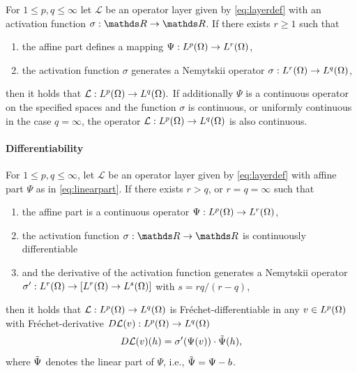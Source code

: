\begin{proposition}{\cite[Prop. 1]{kabri2023resolution}}{}
	For $1 \leq p, q \leq \infty$ let $\mathcal{L}$ be an operator layer given by \eqref{eq:layerdef} with an activation function $\sigma: \R \rightarrow \R$.
	If there exists $r \geq 1$ such that
	\begin{enumerate}[label=(\roman*)]
		\item the affine part defines a mapping $\Psi: L^p(\Omega) \rightarrow L^r(\Omega)$,
		\item the activation function $\sigma$ generates a Nemytskii operator $\sigma: L^r(\Omega) \rightarrow L^q(\Omega)$,
	\end{enumerate}
	then it holds that
	$
	\mathcal{L}: L^p(\Omega) \rightarrow L^q(\Omega).
	$
	If additionally $\Psi$ is a continuous operator on the specified spaces and the function $\sigma$ is continuous, or uniformly continuous in the case $q=\infty$, the operator $\mathcal{L}: L^p(\Omega) \rightarrow L^q(\Omega)$ is also continuous.
\end{proposition}

\paragraph{Differentiability}

\begin{proposition}{\cite[Prop. 2]{kabri2023resolution}}{}
	For $1 \leq p, q \leq \infty$, let $\mathcal{L}$ be an operator layer given by \eqref{eq:layerdef} with affine part $\Psi$ as in \eqref{eq:linearpart}. If there exists $r>q$, or $r = q = \infty$ such that
	\begin{enumerate}[label=(\roman*)]
		\item the affine part is a continuous operator $\Psi: L^p(\Omega) \rightarrow L^r(\Omega)$,
		\item the activation function $\sigma: \R \rightarrow \R$ is continuously differentiable
		\item and the derivative of the activation function generates a Nemytskii operator $\sigma': L^r(\Omega) \rightarrow \left[L^r(\Omega) \rightarrow L^{s}(\Omega) \right]$ with $s = {rq}/{(r-q)}$,
	\end{enumerate}
	then it holds that $\mathcal{L}:  L^p(\Omega) \rightarrow L^q(\Omega)$ is Fréchet-differentiable in any $v \in L^p(\Omega)$ with Fréchet-derivative $D\mathcal{L}(v): L^p(\Omega) \rightarrow L^q(\Omega)$
	\begin{align*}
		D\mathcal{L}(v)(h) = \sigma'(\Psi(v))\cdot\Tilde{\Psi}(h),
	\end{align*}
	where $\Tilde{\Psi}$ denotes the linear part of $\Psi$, i.e., $\Tilde{\Psi} = \Psi - b$.
\end{proposition}
%
%
